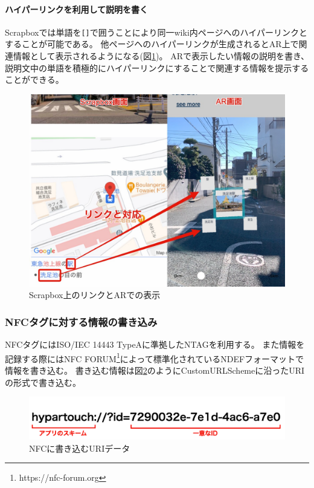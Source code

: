 \paragraph*{ハイパーリンクを利用して説明を書く}
Scrapboxでは単語を\texttt{[]}で囲うことにより同一wiki内ページへのハイパーリンクとすることが可能である。
他ページヘのハイパーリンクが生成されるとAR上で関連情報として表示されるようになる(図\ref{fig:scrapbox_link_and_ar})。
ARで表示したい情報の説明を書き、説明文中の単語を積極的にハイパーリンクにすることで関連する情報を提示することができる。

\begin{figure}[h]
  \centering
  \includegraphics[width=120mm]{images/scrapbox_link_and_ar.jpg}
  \caption{Scrapbox上のリンクとARでの表示} \label{fig:scrapbox_link_and_ar}
\end{figure}

\subsubsection{NFCタグに対する情報の書き込み}
NFCタグにはISO/IEC 14443 TypeAに準拠したNTAGを利用する。
また情報を記録する際にはNFC FORUM\footnote{\textsf{https://nfc-forum.org}}によって標準化されているNDEFフォーマットで情報を書き込む。
書き込む情報は図\ref{fig:nfc_uri}のようにCustomURLSchemeに沿ったURIの形式で書き込む。

\begin{figure}[h]
  \centering
  \includegraphics[width=120mm]{images/nfc_uri.png}
  \caption{NFCに書き込むURIデータ} \label{fig:nfc_uri}
\end{figure}

